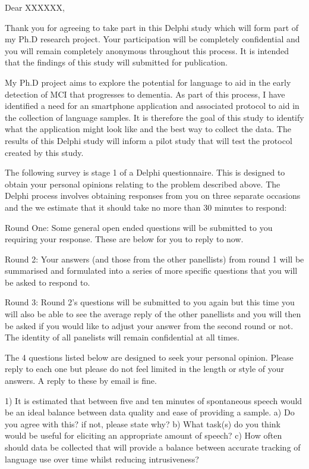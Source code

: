 \documentclass{article}
\begin{document}
Dear XXXXXX, 

Thank you for agreeing to take part in this Delphi study which will form part of my Ph.D research project. Your participation will be completely confidential and you will remain completely anonymous throughout this process. It is intended that the findings of this study will submitted for publication. 

My Ph.D project aims to explore the potential for language to aid in the early detection of MCI that progresses to dementia. As part of this process, I have identified a need for an smartphone application and associated protocol to aid in the collection of language samples. It is therefore the goal of this study to identify what the application might look like and the best way to collect the data. The results of this Delphi study will inform a pilot study that will test the protocol created by this study.

The following survey is stage 1 of a Delphi questionnaire. This is designed to obtain your personal opinions relating to the problem described above. The Delphi process involves obtaining responses from you on three separate occasions and the we estimate that it should take no more than 30 minutes to respond:

Round One: Some general open ended questions will be submitted to you requiring your response. These are below for you to reply to now. 

Round 2: Your answers (and those from the other panellists) from round 1 will be summarised and formulated into a series of more specific questions that you will be asked to respond to.

Round 3: Round 2’s questions will be submitted to you again but this time you will also be able to see the average reply of the other panellists and you will then be asked if you would like to adjust your answer from the second round or not. The identity of all panelists will remain confidential at all times.

The 4 questions listed below are designed to seek your personal opinion. Please reply to each one but please do not feel limited in the length or style of your answers. A reply to these by email is fine.

1) It is estimated that between five and ten minutes of spontaneous speech would be an ideal balance between data quality and ease of providing a sample. 
	a) Do you agree with this? if not, please state why?
	b) What task(s) do you think would be useful for eliciting an appropriate amount of speech?
	c) How often should data be collected that will provide a balance between accurate tracking of language use over time whilst reducing intrusiveness?
	
\end{document}
